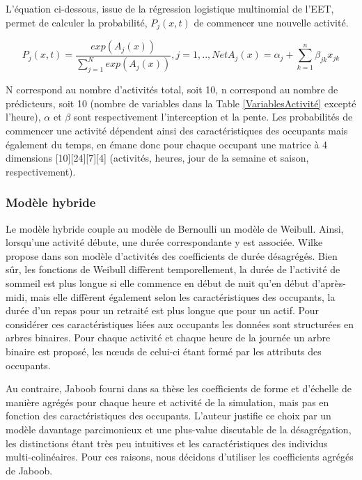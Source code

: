 L'équation ci-dessous, issue de la régression logistique multinomial de l'EET, permet de calculer la probabilité, $P_{j}(x,t)$ de commencer une nouvelle activité.

\begin{equation}
P_{j}(x,t)=\frac{exp(A_{j}(x))}{\sum\limits_{j=1}^{N}exp(A_{j}(x))}, j = 1, .., N et A_{j}(x)= \alpha_{j}+\sum\limits_{k=1}^{n}\beta_{jk}x_{jk}
\end{equation}

N correspond au nombre d'activités total, soit 10, n correspond au nombre de prédicteurs, soit 10 (nombre de variables dans la Table \ref{VariablesActivité} excepté l'heure), $\alpha$ et $\beta$ sont respectivement l'interception et la pente. Les probabilités de commencer une activité dépendent ainsi des caractéristiques des occupants mais également du temps, en émane donc pour chaque occupant une matrice à 4 dimensions [10][24][7][4] (activités, heures, jour de la semaine et saison, respectivement).

\subsubsection{Modèle hybride}

Le modèle hybride couple au modèle de Bernoulli un modèle de Weibull. Ainsi, lorsqu'une activité débute, une durée correspondante y est associée. Wilke propose dans son modèle d'activités des coefficients de durée désagrégés. Bien sûr, les fonctions de Weibull diffèrent temporellement, la durée de l'activité de sommeil est plus longue si elle commence en début de nuit qu'en début d'après-midi, mais elle diffèrent également selon les caractéristiques des occupants, la durée d'un repas pour un retraité est plus longue que pour un actif. Pour considérer ces caractéristiques liées aux occupants les données sont structurées en arbres binaires. Pour chaque activité et chaque heure de la journée un arbre binaire est proposé, les nœuds de celui-ci étant formé par les attributs des occupants.

Au contraire, Jaboob \cite{Jaboob-16} fourni dans sa thèse les coefficients de forme et d'échelle de manière agrégés pour chaque heure et activité de la simulation, mais pas en fonction des caractéristiques des occupants. L'auteur justifie ce choix par un modèle davantage parcimonieux et une plus-value discutable de la désagrégation, les distinctions étant très peu intuitives et les caractéristiques des individus  multi-colinéaires. Pour ces raisons, nous décidons d'utiliser les coefficients agrégés de Jaboob.

